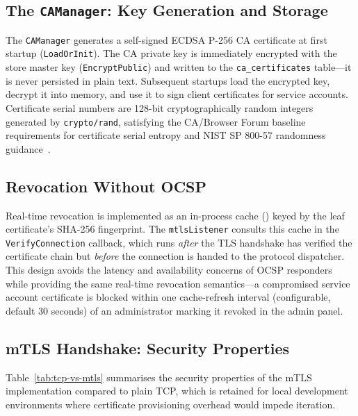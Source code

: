 \subsection{The \texttt{CAManager}: Key Generation and Storage}

The  \texttt{CAManager} generates a self-signed ECDSA P-256 CA certificate at first startup (\texttt{LoadOrInit}). The CA private key is immediately encrypted with the store master key (\texttt{EncryptPublic}) and written to the \texttt{ca\_certificates} table---it is never persisted in plain text. Subsequent startups load the encrypted key, decrypt it into memory, and use it to sign client certificates for service accounts. Certificate serial numbers are 128-bit cryptographically random integers generated by \texttt{crypto/rand}, satisfying the CA/Browser Forum baseline requirements for certificate serial entropy and NIST SP 800-57 randomness guidance~\cite{nist-key}.

\subsection{Revocation Without OCSP}

Real-time revocation is implemented as an in-process cache () keyed by the leaf certificate's SHA-256 fingerprint. The \texttt{mtlsListener} consults this cache in the \texttt{VerifyConnection} callback, which runs \emph{after} the TLS handshake has verified the certificate chain but \emph{before} the connection is handed to the protocol dispatcher. This design avoids the latency and availability concerns of OCSP responders while providing the same real-time revocation semantics---a compromised service account certificate is blocked within one cache-refresh interval (configurable, default 30 seconds) of an administrator marking it revoked in the admin panel.

\subsection{mTLS Handshake: Security Properties}

Table~\ref{tab:tcp-vs-mtls} summarises the security properties of the mTLS implementation compared to plain TCP, which is retained for local development environments where certificate provisioning overhead would impede iteration.

